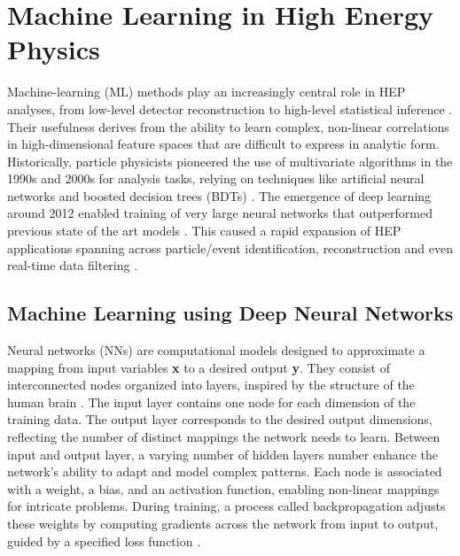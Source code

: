 \chapter{Machine Learning in High Energy Physics}

Machine-learning (ML) methods play an increasingly central role in HEP analyses, from low-level detector reconstruction to high-level statistical inference \cite{PhysRevD.112.016004}. Their usefulness derives from the ability to learn complex, non-linear correlations in high-dimensional feature spaces that are difficult to express in analytic form. Historically, particle physicists pioneered the use of multivariate algorithms in the 1990s and 2000s for analysis tasks, relying on techniques like artificial neural networks and boosted decision trees (BDTs) \cite{Guest_2018}. The emergence of deep learning around 2012 enabled training of very large neural networks that outperformed previous state of the art models \cite{Guest_2018}. This caused a rapid expansion of HEP applications spanning across particle/event identification, reconstruction and even real-time data filtering \cite{albertsson2019machinelearninghighenergy}.


\section{Machine Learning using Deep Neural Networks}

Neural networks (NNs) are computational models designed to approximate a mapping from input variables \textbf{x} to a desired output \textbf{y}. They consist of interconnected nodes organized into layers, inspired by the structure of the human brain \cite{hammad2024artificialneuralnetworkdeep}. The input layer contains one node for each dimension of the training data. The output layer corresponds to the desired output dimensions, reflecting the number of distinct mappings the network needs to learn. Between input and output layer, a varying number of hidden layers number enhance the network’s ability to adapt and model complex patterns. Each node is associated with a weight, a bias, and an activation function, enabling non-linear mappings for intricate problems. During training, a process called backpropagation adjusts these weights by computing gradients across the network from input to output, guided by a specified loss function \cite{Goodfellow-et-al-2016}.

